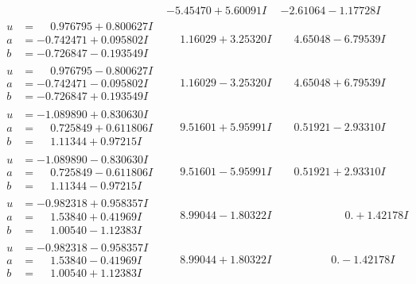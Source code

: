 \documentclass[1p]{elsarticle_modified}
\theoremstyle{definition}
\begin{document}
$$\begin{array}{c|c|c}
 & -5.45470 + 5.60091 I & -2.61064 - 1.17728 I \\ \hline\begin{aligned}
u &= \phantom{-}0.976795 + 0.800627 I \\
a &= -0.742471 + 0.095802 I \\
b &= -0.726847 - 0.193549 I\end{aligned}
 & \phantom{-}1.16029 + 3.25320 I & \phantom{-}4.65048 - 6.79539 I \\ \hline\begin{aligned}
u &= \phantom{-}0.976795 - 0.800627 I \\
a &= -0.742471 - 0.095802 I \\
b &= -0.726847 + 0.193549 I\end{aligned}
 & \phantom{-}1.16029 - 3.25320 I & \phantom{-}4.65048 + 6.79539 I \\ \hline\begin{aligned}
u &= -1.089890 + 0.830630 I \\
a &= \phantom{-}0.725849 + 0.611806 I \\
b &= \phantom{-}1.11344 + 0.97215 I\end{aligned}
 & \phantom{-}9.51601 + 5.95991 I & \phantom{-}0.51921 - 2.93310 I \\ \hline\begin{aligned}
u &= -1.089890 - 0.830630 I \\
a &= \phantom{-}0.725849 - 0.611806 I \\
b &= \phantom{-}1.11344 - 0.97215 I\end{aligned}
 & \phantom{-}9.51601 - 5.95991 I & \phantom{-}0.51921 + 2.93310 I \\ \hline\begin{aligned}
u &= -0.982318 + 0.958357 I \\
a &= \phantom{-}1.53840 + 0.41969 I \\
b &= \phantom{-}1.00540 - 1.12383 I\end{aligned}
 & \phantom{-}8.99044 - 1.80322 I & \phantom{-0.000000 -}0. + 1.42178 I \\ \hline\begin{aligned}
u &= -0.982318 - 0.958357 I \\
a &= \phantom{-}1.53840 - 0.41969 I \\
b &= \phantom{-}1.00540 + 1.12383 I\end{aligned}
 & \phantom{-}8.99044 + 1.80322 I & \phantom{-0.000000 } 0. - 1.42178 I \\ \hline\begin{aligned}

\end{aligned}
\end{array}$$
\end{document}
